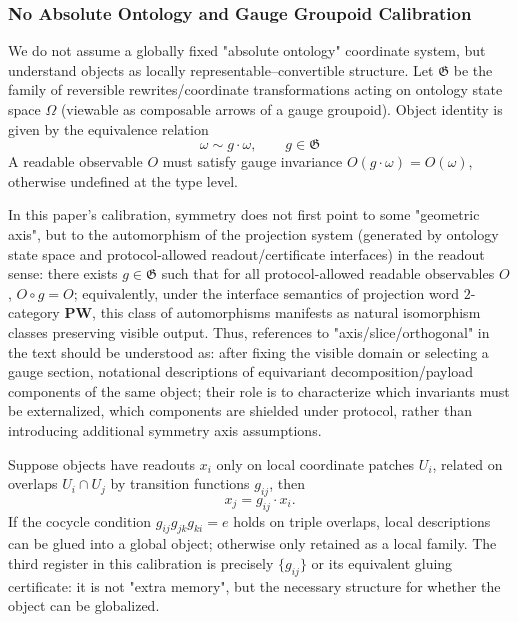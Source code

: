 \subsubsection{No Absolute Ontology and Gauge Groupoid Calibration}\label{subsec:pom-gauge-groupoid}
We do not assume a globally fixed "absolute ontology" coordinate system, but understand objects as locally representable–convertible structure. Let \(\mathfrak{G}\) be the family of reversible rewrites/coordinate transformations acting on ontology state space \(\Omega\) (viewable as composable arrows of a gauge groupoid). Object identity is given by the equivalence relation
\[
\omega\sim g\cdot\omega,\qquad g\in\mathfrak{G}
\]
A readable observable \(O\) must satisfy gauge invariance \(O(g\cdot\omega)=O(\omega)\), otherwise undefined at the type level.

\begin{remark}\label{rem:symmetry-projection-automorphism}
In this paper's calibration, symmetry does not first point to some "geometric axis", but to the automorphism of the projection system (generated by ontology state space and protocol-allowed readout/certificate interfaces) in the readout sense: there exists \(g\in\mathfrak{G}\) such that for all protocol-allowed readable observables \(O\), \(O\circ g=O\);
equivalently, under the interface semantics of projection word \(2\)-category \(\mathbf{PW}\), this class of automorphisms manifests as natural isomorphism classes preserving visible output.
Thus, references to "axis/slice/orthogonal" in the text should be understood as: after fixing the visible domain or selecting a gauge section, notational descriptions of equivariant decomposition/payload components of the same object; their role is to characterize which invariants must be externalized, which components are shielded under protocol, rather than introducing additional symmetry axis assumptions.
\end{remark}

\begin{remark}\label{rem:pom-gauge-third-register}
Suppose objects have readouts \(x_i\) only on local coordinate patches \(U_i\), related on overlaps \(U_i\cap U_j\) by transition functions \(g_{ij}\), then
\[
x_j=g_{ij}\cdot x_i.
\]
If the cocycle condition \(g_{ij}g_{jk}g_{ki}=e\) holds on triple overlaps, local descriptions can be glued into a global object; otherwise only retained as a local family. The third register in this calibration is precisely \(\{g_{ij}\}\) or its equivalent gluing certificate: it is not "extra memory", but the necessary structure for whether the object can be globalized.
\end{remark}

